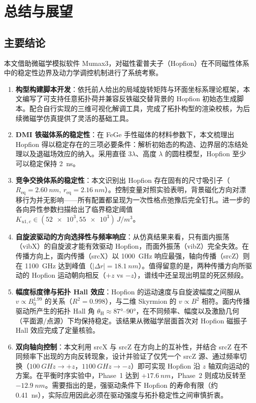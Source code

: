 \chapter{总结与展望}

\section{主要结论}

本文借助微磁学模拟软件 Mumax3，对磁性霍普夫子（Hopfion）在不同磁性体系中的稳定性边界及动力学调控机制进行了系统考察。

\begin{enumerate}[label=(\arabic*)]
  \item \textbf{构型构建脚本开发}：依托前人给出的局域旋转矩阵与环面坐标系理论框架，本文编写了可支持任意拓扑荷并兼容反铁磁交替背景的 Hopfion 初始态生成脚本。配合自行实现的三维可视化解调工具，完成了拓扑构型的渲染校核，为后续微磁学仿真提供了灵活的基础工具。

  \item \textbf{DMI 铁磁体系的稳定性}：在 FeGe 手性磁体的材料参数下，本文梳理出 Hopfion 得以稳定存在的三项必要条件：解析初始态的构造、边界层的冻结处理以及退磁场效应的纳入。采用直径 $3\lambda$、高度 $\lambda$ 的圆柱模型，Hopfion 至少可以稳定保持 \SI{2}{ns}。

  \item \textbf{竞争交换体系的稳定性}：本文识别出 Hopfion 存在固有的尺寸吸引子（$R_{\text{eq}} = \SI{2.60}{nm}$, $r_{\text{eq}} = \SI{2.16}{nm}$）。控制变量对照实验表明，背景磁化方向对漂移行为并无影响——所有配置都呈现为一次性格点弛豫后完全钉扎。进一步的各向异性参数扫描给出了临界稳定阈值 $K_{u1,c} \in (\num{52e3}, \num{55e3}) \, \si{J/m^3}$。

  \item \textbf{自旋波驱动的方向选择性与频率响应}：从仿真结果来看，只有面内振荡（vibX）的自旋波才能有效驱动 Hopfion，而面外振荡（vibZ）完全失效。在传播方向上，面内传播（srcX）以 \SI{1000}{GHz} 响应最强，轴向传播（srcZ）则在 \SI{1100}{GHz} 达到峰值（$|\Delta r| = \SI{18.1}{nm}$）。值得留意的是，两种传播方向所驱动的 Hopfion 运动朝向相反（$+z$ vs $-z$），谱线中还呈现出明显的死区频段。

  \item \textbf{幅度标度律与拓扑 Hall 效应}：Hopfion 的运动速度与自旋波幅度之间服从 $v \propto B_0^{1.99}$ 的关系（$R^2 = 0.998$），与二维 Skyrmion 的 $v \propto B^2$ 相符。面内传播驱动所产生的拓扑 Hall 角 $\theta_{\text{H}} \approx \ang{87}$--$\ang{90}$，在不同频率、幅度以及激励几何（平面源/点源）下均保持稳定。该结果从微磁学层面首次对 Hopfion 磁振子 Hall 效应完成了定量核验。

  \item \textbf{双向轴向控制}：本文利用 srcX 与 srcZ 在方向上的互补性，并结合 srcZ 在不同频率下出现的方向反转现象，设计并验证了仅凭一个 srcZ 源、通过频率切换（$\SI{100}{GHz} \to +z$，$\SI{1100}{GHz} \to -z$）即可实现 Hopfion 沿 $z$ 轴双向运动的方案。在平衡时序实验中，Phase~1 达到 $+\SI{17.6}{nm}$，Phase~2 则成功反转至 $-\SI{12.9}{nm}$。需要指出的是，强驱动条件下 Hopfion 的寿命有限（约 \SI{0.41}{ns}），实际应用因此必须在驱动强度与拓扑稳定性之间审慎折衷。
\end{enumerate}


